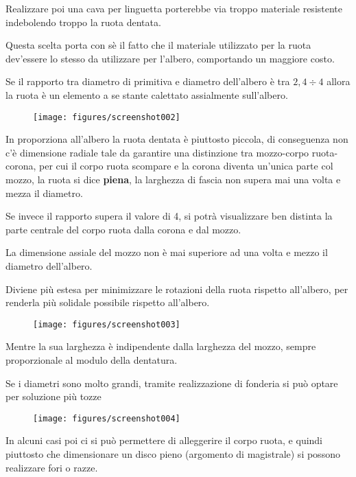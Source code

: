 \documentclass[a4paper, 15pt]{article}
\begin{document}
\begin{adjustwidth}{2in}{}
Realizzare poi una cava per linguetta porterebbe via troppo materiale resistente indebolendo troppo la ruota dentata. 

Questa scelta porta con sè il fatto che il materiale utilizzato per la ruota dev'essere lo stesso da utilizzare per l'albero, comportando un maggiore costo. \newline 

Se il rapporto tra diametro di primitiva e diametro dell'albero è tra $2,4\div4$ allora la ruota è un elemento a se stante calettato assialmente sull'albero. 
\begin{figure}[H]
	\centering
	\texttt{[image: figures/screenshot002]}
	\label{fig:screenshot002}
\end{figure}
In proporziona all'albero la ruota dentata è piuttosto piccola, di conseguenza non c'è dimensione radiale tale da garantire una distinzione tra mozzo-corpo ruota-corona, per cui il corpo ruota scompare e la corona diventa un'unica parte col mozzo, la ruota si dice \textbf{piena}, la larghezza di fascia non supera mai una volta e mezza il diametro. \newline 

Se invece il rapporto supera il valore di 4, si potrà visualizzare ben distinta la parte centrale del corpo ruota dalla corona e dal mozzo. 

La dimensione assiale del mozzo non è mai superiore ad una volta e mezzo il diametro dell'albero.

Diviene più estesa per minimizzare le rotazioni della ruota rispetto all'albero, per renderla più solidale possibile rispetto all'albero. 
\begin{figure}[H]
	\centering
	\texttt{[image: figures/screenshot003]}
	\label{fig:screenshot003}
\end{figure}
Mentre la sua larghezza è indipendente dalla larghezza del mozzo, sempre proporzionale al modulo della dentatura. \newline 

Se i diametri sono molto grandi, tramite realizzazione di fonderia si può optare per soluzione più tozze
\begin{figure}[H]
	\centering
	\texttt{[image: figures/screenshot004]}
	\label{fig:screenshot004}
\end{figure}

In alcuni casi poi ci si può permettere di alleggerire il corpo ruota, e quindi piuttosto che dimensionare un disco pieno (argomento di magistrale) si possono realizzare fori o razze. 


\end{adjustwidth}
\end{document}
